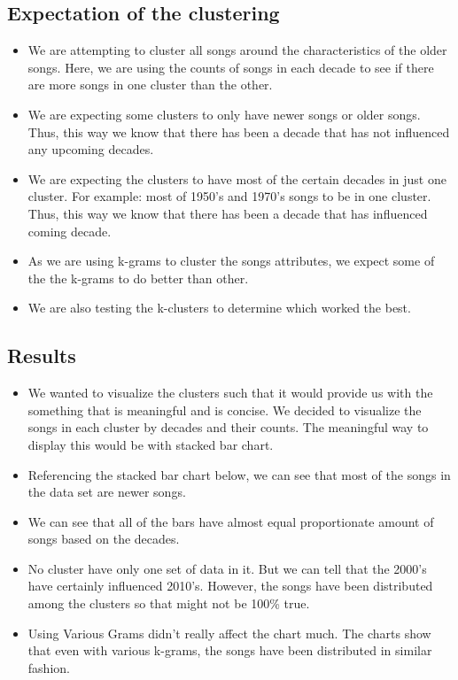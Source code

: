 \documentclass[12pt]{article}
\begin{document}
\subsection*{Expectation of the clustering}
\begin{itemize}
	\item We are attempting to cluster all songs around the characteristics of the older songs. Here, we are using the counts of songs in each decade to see if there are more songs in one cluster than the other.
	\item We are expecting some clusters to only have newer songs or older songs. Thus, this way we know that there has been a decade that has not influenced any upcoming decades.
	\item  We are expecting the clusters to have most of the certain decades in just one cluster. For example: most of 1950's and 1970's songs to be in one cluster. Thus, this way we know that there has been a decade that has  influenced coming decade.
	\item As we are using k-grams to cluster the songs attributes, we expect some of the the k-grams to do better than other. 
	\item We are also testing the k-clusters to determine which worked the best. 
\end{itemize}
\subsection*{Results}
\begin{itemize}
\item We wanted to visualize the clusters such that it would provide us with the something that is meaningful and is concise. We decided to visualize the songs in each cluster by decades and their counts. The meaningful way to display this would be with stacked bar chart.
\item Referencing the stacked bar chart below, we can see that most of the songs in the data set are newer songs. 
\item We can see that all of the bars have almost equal proportionate amount of songs based on the decades.
\item No cluster have only one set of data in it. But we can tell that the 2000's have certainly influenced 2010's. However, the songs have been distributed among the clusters so that might not be 100\% true.
\item Using Various Grams didn't really affect the chart much. The charts show that even with various k-grams, the songs have been distributed in similar fashion.  
\end{itemize}
\end{document}

